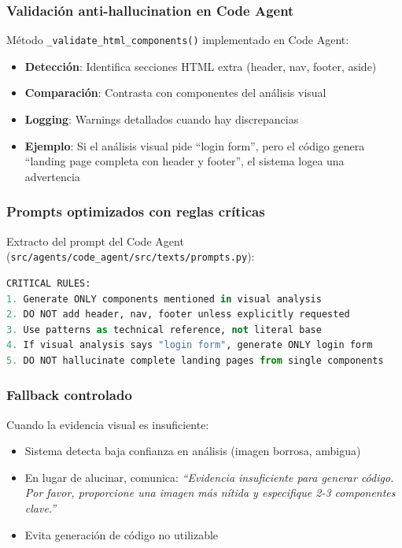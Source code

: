 \documentclass[12pt,a4paper]{article}
\begin{document}
\subsubsection{Validación anti-hallucination en Code Agent}

Método \texttt{\_validate\_html\_components()} implementado en Code Agent:

\begin{itemize}
    \item \textbf{Detección}: Identifica secciones HTML extra (header, nav, footer, aside)
    \item \textbf{Comparación}: Contrasta con componentes del análisis visual
    \item \textbf{Logging}: Warnings detallados cuando hay discrepancias
    \item \textbf{Ejemplo}: Si el análisis visual pide ``login form'', pero el código genera ``landing page completa con header y footer'', el sistema logea una advertencia
\end{itemize}

\subsubsection{Prompts optimizados con reglas críticas}

Extracto del prompt del Code Agent (\texttt{src/agents/code\_agent/src/texts/prompts.py}):

\begin{lstlisting}[language=Python,caption={Fragmento de Prompt Anti-Hallucination}]
CRITICAL RULES:
1. Generate ONLY components mentioned in visual analysis
2. DO NOT add header, nav, footer unless explicitly requested
3. Use patterns as technical reference, not literal base
4. If visual analysis says "login form", generate ONLY login form
5. DO NOT hallucinate complete landing pages from single components
\end{lstlisting}

\subsubsection{Fallback controlado}

Cuando la evidencia visual es insuficiente:

\begin{itemize}
    \item Sistema detecta baja confianza en análisis (imagen borrosa, ambigua)
    \item En lugar de alucinar, comunica: \textit{``Evidencia insuficiente para generar código. Por favor, proporcione una imagen más nítida y especifique 2-3 componentes clave.''}
    \item Evita generación de código no utilizable
\end{itemize}
\end{document}

